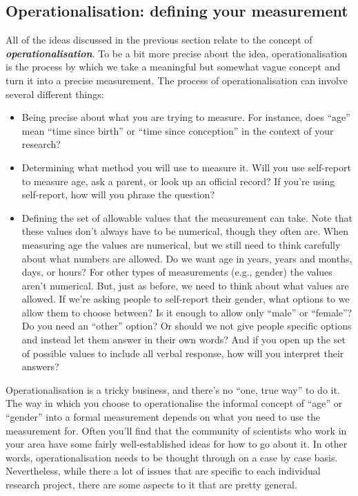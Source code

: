 \documentclass[
]{book}
\providecommand{\tightlist}{%
  \setlength{\itemsep}{0pt}\setlength{\parskip}{0pt}}
\begin{document}
\hypertarget{operationalisation-defining-your-measurement}{%
\subsection{Operationalisation: defining your measurement}\label{operationalisation-defining-your-measurement}}

All of the ideas discussed in the previous section relate to the concept of \textbf{\emph{operationalisation}}. To be a bit more precise about the idea, operationalisation is the process by which we take a meaningful but somewhat vague concept and turn it into a precise measurement. The process of operationalisation can involve several different things:

\begin{itemize}
\tightlist
\item
  Being precise about what you are trying to measure. For instance, does ``age'' mean ``time since birth'' or ``time since conception'' in the context of your research?
\item
  Determining what method you will use to measure it. Will you use self-report to measure age, ask a parent, or look up an official record? If you're using self-report, how will you phrase the question?
\item
  Defining the set of allowable values that the measurement can take. Note that these values don't always have to be numerical, though they often are. When measuring age the values are numerical, but we still need to think carefully about what numbers are allowed. Do we want age in years, years and months, days, or hours? For other types of measurements (e.g., gender) the values aren't numerical. But, just as before, we need to think about what values are allowed. If we're asking people to self-report their gender, what options to we allow them to choose between? Is it enough to allow only ``male'' or ``female''? Do you need an ``other'' option? Or should we not give people specific options and instead let them answer in their own words? And if you open up the set of possible values to include all verbal response, how will you interpret their answers?
\end{itemize}

Operationalisation is a tricky business, and there's no ``one, true way'' to do it. The way in which you choose to operationalise the informal concept of ``age'' or ``gender'' into a formal measurement depends on what you need to use the measurement for. Often you'll find that the community of scientists who work in your area have some fairly well-established ideas for how to go about it. In other words, operationalisation needs to be thought through on a case by case basis. Nevertheless, while there a lot of issues that are specific to each individual research project, there are some aspects to it that are pretty general.
\end{document}

